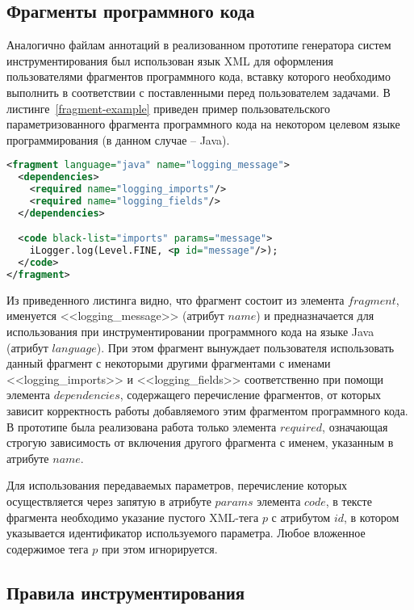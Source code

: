 \subsection{Фрагменты программного кода}

Аналогично файлам аннотаций в реализованном прототипе генератора систем инструментирования был использован язык XML для оформления пользователями фрагментов программного кода, вставку которого необходимо выполнить в соответствии с поставленными перед пользователем задачами.
В листинге~\ref{fragment-example} приведен пример пользовательского параметризованного фрагмента программного кода на некотором целевом языке программирования (в данном случае -- Java).

\begin{lstlisting}[frame=single, language=XML, label={fragment-example}, caption={Пример пользовательского фрагмента.}]
<fragment language="java" name="logging_message">
  <dependencies>
    <required name="logging_imports"/>
    <required name="logging_fields"/>
  </dependencies>

  <code black-list="imports" params="message">
    iLogger.log(Level.FINE, <p id="message"/>);
  </code>
</fragment>
\end{lstlisting}

Из приведенного листинга видно, что фрагмент состоит из элемента $fragment$, именуется <<logging\_message>> (атрибут $name$) и предназначается для использования при инструментировании программного кода на языке Java (атрибут $language$).
При этом фрагмент вынуждает пользователя использовать данный фрагмент с некоторыми другими фрагментами с именами <<logging\_imports>> и <<logging\_fields>> соответственно при помощи элемента $dependencies$, содержащего перечисление фрагментов, от которых зависит корректность работы добавляемого этим фрагментом программного кода.
В прототипе была реализована работа только элемента $required$, означающая строгую зависимость от включения другого фрагмента с именем, указанным в атрибуте $name$.

Для использования передаваемых параметров, перечисление которых осуществляется через запятую в атрибуте $params$ элемента $code$, в тексте фрагмента необходимо указание пустого XML-тега $p$ с атрибутом $id$, в котором указывается идентификатор используемого параметра.
Любое вложенное содержимое тега $p$ при этом игнорируется.

\subsection{Правила инструментирования}

